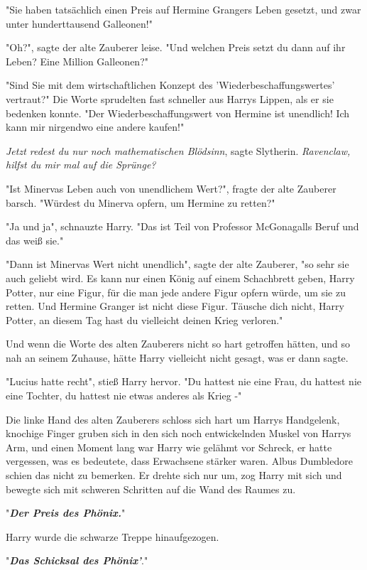 {"Sie haben tatsächlich einen Preis auf Hermine Grangers Leben gesetzt, und zwar unter hunderttausend Galleonen!"

"Oh?", sagte der alte Zauberer leise. "Und welchen Preis setzt du dann auf ihr Leben? Eine Million Galleonen?"

"Sind Sie mit dem wirtschaftlichen Konzept des 'Wiederbeschaffungswertes' vertraut?" Die Worte sprudelten fast schneller aus Harrys Lippen, als er sie bedenken konnte. "Der Wiederbeschaffungswert von Hermine ist unendlich! Ich kann mir nirgendwo eine andere kaufen!"

\emph{Jetzt redest du nur noch mathematischen Blödsinn}, sagte Slytherin. \emph{Ravenclaw, hilfst du mir mal auf die Sprünge?}

"Ist Minervas Leben auch von unendlichem Wert?", fragte der alte Zauberer barsch. "Würdest du Minerva opfern, um Hermine zu retten?"

"Ja und ja", schnauzte Harry. "Das ist Teil von Professor McGonagalls Beruf und das weiß sie."

"Dann ist Minervas Wert nicht unendlich", sagte der alte Zauberer, "so sehr sie auch geliebt wird. Es kann nur einen König auf einem Schachbrett geben, Harry Potter, nur eine Figur, für die man jede andere Figur opfern würde, um sie zu retten. Und Hermine Granger ist nicht diese Figur. Täusche dich nicht, Harry Potter, an diesem Tag hast du vielleicht deinen Krieg verloren."

Und wenn die Worte des alten Zauberers nicht so hart getroffen hätten, und so nah an seinem Zuhause, hätte Harry vielleicht nicht gesagt, was er dann sagte.

"Lucius hatte recht", stieß Harry hervor. "Du hattest nie eine Frau, du hattest nie eine Tochter, du hattest nie etwas anderes als Krieg -"

Die linke Hand des alten Zauberers schloss sich hart um Harrys Handgelenk, knochige Finger gruben sich in den sich noch entwickelnden Muskel von Harrys Arm, und einen Moment lang war Harry wie gelähmt vor Schreck, er hatte vergessen, was es bedeutete, dass Erwachsene stärker waren. Albus Dumbledore schien das nicht zu bemerken. Er drehte sich nur um, zog Harry mit sich und bewegte sich mit schweren Schritten auf die Wand des Raumes zu.

"\textbf{\emph{Der Preis des Phönix.}}"

Harry wurde die schwarze Treppe hinaufgezogen.

"\textbf{\emph{Das Schicksal des Phönix'}}."

}
